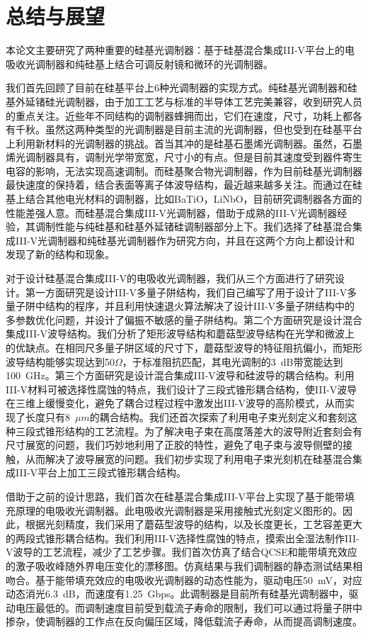 \chapter{总结与展望}
本论文主要研究了两种重要的硅基光调制器：基于硅基混合集成III-V平台上的电吸收光调制器和纯硅基上结合可调反射镜和微环的光调制器。

我们首先回顾了目前在硅基平台上6种光调制器的实现方式。纯硅基光调制器和硅基外延锗硅光调制器，由于加工工艺与标准的半导体工艺完美兼容，收到研究人员的重点关注。近些年不同结构的调制器蜂拥而出，它们在速度，尺寸，功耗上都各有千秋。虽然这两种类型的光调制器是目前主流的光调制器，但也受到在硅基平台上利用新材料的光调制器的挑战。首当其冲的是硅基石墨烯光调制器。虽然，石墨烯光调制器具有，调制光学带宽宽，尺寸小的有点。但是目前其速度受到器件寄生电容的影响，无法实现高速调制。而硅基聚合物光调制器，作为目前硅基光调制器最快速度的保持着，结合表面等离子体波导结构，最近越来越多关注。而通过在硅基上结合其他电光材料的调制器，比如BaTiO，LiNbO，目前研究调制器各方面的性能差强人意。而硅基混合集成III-V光调制器，借助于成熟的III-V光调制器经验，其调制性能与纯硅基和硅基外延锗硅调制器部分上下。我们选择了硅基混合集成III-V光调制器和纯硅基光调制器作为研究方向，并且在这两个方向上都设计和发现了新的结构和现象。

对于设计硅基混合集成III-V的电吸收光调制器，我们从三个方面进行了研究设计。第一方面研究是设计III-V多量子阱结构，我们自己编写了用于设计了III-V多量子阱中结构的程序，并且利用快速退火算法解决了设计III-V多量子阱结构中的多参数优化问题，并设计了偏振不敏感的量子阱结构。第二个方面研究是设计混合集成III-V波导结构。我们分析了矩形波导结构和蘑菇型波导结构在光学和微波上的优缺点。在相同尺多量子阱区域的尺寸下，蘑菇型波导的特征阻抗偏小，而矩形波导结构能够实现达到50$\Omega$，于标准阻抗匹配，其电光调制的3~dB带宽能达到100~GHz。第三个方面研究是设计混合集成III-V波导和硅波导的耦合结构。利用III-V材料可被选择性腐蚀的特点，我们设计了三段式锥形耦合结构，使III-V波导在三维上缓慢变化，避免了耦合过程过程中激发出III-V波导的高阶模式，从而实现了长度只有8~$\mu m$的耦合结构。我们还首次探索了利用电子束光刻定义和套刻这种三段式锥形结构的工艺流程。为了解决电子束在高度落差大的波导附近套刻会有尺寸展宽的问题，我们巧妙地利用了正胶的特性，避免了电子束与波导侧壁的接触，从而解决了波导展宽的问题。我们初步实现了利用电子束光刻机在硅基混合集成III-V平台上加工三段式锥形耦合结构。

借助于之前的设计思路，我们首次在硅基混合集成III-V平台上实现了基于能带填充原理的电吸收光调制器。此电吸收光调制器是采用接触式光刻定义图形的。因此，根据光刻精度，我们采用了蘑菇型波导的结构，以及长度更长，工艺容差更大的两段式锥形耦合结构。我们利用III-V选择性腐蚀的特点，摸索出全湿法制作III-V波导的工艺流程，减少了工艺步骤。我们首次仿真了结合QCSE和能带填充效应的激子吸收峰随外界电压变化的漂移图。仿真结果与我们调制器的静态测试结果相吻合。基于能带填充效应的电吸收光调制器的动态性能为，驱动电压50~mV，对应动态消光6.3~dB，而速度有1.25~Gbps。此调制器是目前所有硅基光调制器中，驱动电压最低的。而调制速度目前受到载流子寿命的限制，我们可以通过将量子阱中掺杂，使调制器的工作点在反向偏压区域，降低载流子寿命，从而提高调制速度。

